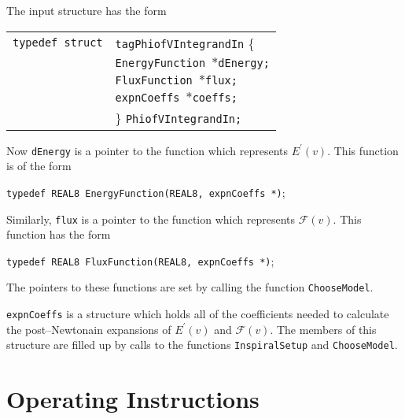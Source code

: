\documentclass[12pt]{article}
\begin{document}
The input structure has the form

\vspace{5mm}

\begin{tabular}{ll}
\texttt{typedef struct} & \texttt{tagPhiofVIntegrandIn} \{ \\
                        & \texttt{EnergyFunction $\ast$dEnergy;}  \\
                        & \texttt{FluxFunction $\ast$flux;}  \\
                        & \texttt{expnCoeffs $\ast$coeffs;}  \\
                        & \} \texttt{PhiofVIntegrandIn;}
\end{tabular}

\vspace{5mm}


Now \texttt{dEnergy} is a pointer to the function which represents $E^{\prime}(v)$. This function is of the form

\vspace{5mm}

\texttt{typedef REAL8 EnergyFunction(REAL8, expnCoeffs *)};

\vspace{5mm}

Similarly, \texttt{flux} is a pointer to the function which represents $\mathcal{F}(v)$. This function has the form

\vspace{5mm}

\texttt{typedef REAL8 FluxFunction(REAL8, expnCoeffs *)};

\vspace{5mm}

The pointers to these functions are set by calling the function \texttt{ChooseModel}.

\texttt{expnCoeffs} is a structure which holds all of the coefficients needed to calculate the post--Newtonain expansions of $E^{\prime}(v)$ and $\mathcal{F}(v)$. The members of this structure are filled up by calls to the functions \texttt{InspiralSetup} and \texttt{ChooseModel}.









\section{Operating Instructions}
\end{document}
